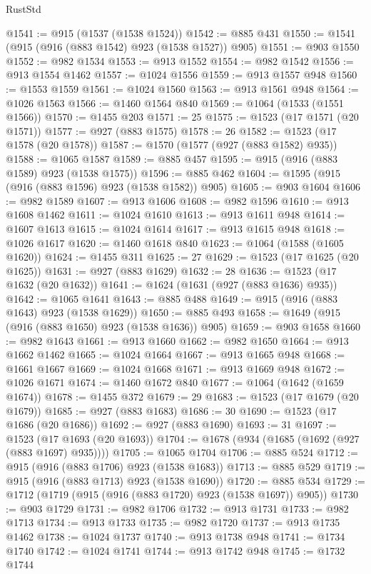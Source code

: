 \begin{lexlean}{RustStd}
\begin{coremodule}
@1541 := @915 (@1537 (@1538 @1524))
@1542 := @885 @431
@1550 := @1541 (@915 (@916 (@883 @1542) @923 (@1538 @1527)) @905)
@1551 := @903 @1550
@1552 := @982 @1534
@1553 := @913 @1552
@1554 := @982 @1542
@1556 := @913 @1554 @1462
@1557 := @1024 @1556
@1559 := @913 @1557 @948
@1560 := @1553 @1559
@1561 := @1024 @1560
@1563 := @913 @1561 @948
@1564 := @1026 @1563
@1566 := @1460 @1564 @840
@1569 := @1064 (@1533 (@1551 @1566))
@1570 := @1455 @203
@1571 := 25
@1575 := @1523 (@17 @1571 (@20 @1571))
@1577 := @927 (@883 @1575)
@1578 := 26
@1582 := @1523 (@17 @1578 (@20 @1578))
@1587 := @1570 (@1577 (@927 (@883 @1582) @935))
@1588 := @1065 @1587
@1589 := @885 @457
@1595 := @915 (@916 (@883 @1589) @923 (@1538 @1575))
@1596 := @885 @462
@1604 := @1595 (@915 (@916 (@883 @1596) @923 (@1538 @1582)) @905)
@1605 := @903 @1604
@1606 := @982 @1589
@1607 := @913 @1606
@1608 := @982 @1596
@1610 := @913 @1608 @1462
@1611 := @1024 @1610
@1613 := @913 @1611 @948
@1614 := @1607 @1613
@1615 := @1024 @1614
@1617 := @913 @1615 @948
@1618 := @1026 @1617
@1620 := @1460 @1618 @840
@1623 := @1064 (@1588 (@1605 @1620))
@1624 := @1455 @311
@1625 := 27
@1629 := @1523 (@17 @1625 (@20 @1625))
@1631 := @927 (@883 @1629)
@1632 := 28
@1636 := @1523 (@17 @1632 (@20 @1632))
@1641 := @1624 (@1631 (@927 (@883 @1636) @935))
@1642 := @1065 @1641
@1643 := @885 @488
@1649 := @915 (@916 (@883 @1643) @923 (@1538 @1629))
@1650 := @885 @493
@1658 := @1649 (@915 (@916 (@883 @1650) @923 (@1538 @1636)) @905)
@1659 := @903 @1658
@1660 := @982 @1643
@1661 := @913 @1660
@1662 := @982 @1650
@1664 := @913 @1662 @1462
@1665 := @1024 @1664
@1667 := @913 @1665 @948
@1668 := @1661 @1667
@1669 := @1024 @1668
@1671 := @913 @1669 @948
@1672 := @1026 @1671
@1674 := @1460 @1672 @840
@1677 := @1064 (@1642 (@1659 @1674))
@1678 := @1455 @372
@1679 := 29
@1683 := @1523 (@17 @1679 (@20 @1679))
@1685 := @927 (@883 @1683)
@1686 := 30
@1690 := @1523 (@17 @1686 (@20 @1686))
@1692 := @927 (@883 @1690)
@1693 := 31
@1697 := @1523 (@17 @1693 (@20 @1693))
@1704 := @1678 (@934 (@1685 (@1692 (@927 (@883 @1697) @935))))
@1705 := @1065 @1704
@1706 := @885 @524
@1712 := @915 (@916 (@883 @1706) @923 (@1538 @1683))
@1713 := @885 @529
@1719 := @915 (@916 (@883 @1713) @923 (@1538 @1690))
@1720 := @885 @534
@1729 := @1712 (@1719 (@915 (@916 (@883 @1720) @923 (@1538 @1697)) @905))
@1730 := @903 @1729
@1731 := @982 @1706
@1732 := @913 @1731
@1733 := @982 @1713
@1734 := @913 @1733
@1735 := @982 @1720
@1737 := @913 @1735 @1462
@1738 := @1024 @1737
@1740 := @913 @1738 @948
@1741 := @1734 @1740
@1742 := @1024 @1741
@1744 := @913 @1742 @948
@1745 := @1732 @1744

\end{coremodule}
\end{lexlean}

